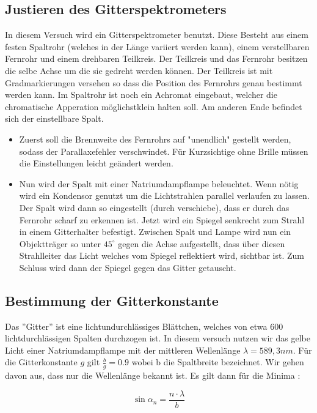 \documentclass[a4paper,titlepage]{scrartcl}
\numberwithin{equation}{section}
\begin{document}
\subsection{Justieren des Gitterspektrometers}
In diesem Versuch wird ein Gitterspektrometer benutzt. Diese Besteht aus einem festen Spaltrohr (welches in der Länge variiert werden kann), einem verstellbaren Fernrohr und einem drehbaren Teilkreis. Der Teilkreis und das Fernrohr besitzen die selbe Achse um die sie gedreht werden können. Der Teilkreis ist mit Gradmarkierungen versehen so dass die Position des Fernrohrs genau bestimmt werden kann. Im Spaltrohr ist noch ein Achromat  eingebaut, welcher die chromatische Apperation möglichstklein halten soll. Am anderen Ende befindet sich der einstellbare Spalt.
 
\begin{itemize}
\item Zuerst soll die Brennweite des Fernrohrs auf "unendlich" gestellt werden, sodass der Parallaxefehler verschwindet. Für Kurzsichtige ohne Brille müssen die Einstellungen leicht geändert werden.
 
\item Nun wird der Spalt mit einer Natriumdampflampe beleuchtet. Wenn nötig wird ein Kondensor genutzt um die Lichtstrahlen parallel verlaufen zu lassen. Der Spalt wird dann so eingestellt (durch verschiebe), dass er durch das Fernrohr scharf zu erkennen ist. Jetzt wird ein Spiegel senkrecht zum Strahl in einem Gitterhalter befestigt. Zwischen Spalt und Lampe wird nun ein Objektträger so unter $45^\circ$ gegen die Achse aufgestellt, dass über diesen Strahlleiter das Licht welches vom Spiegel reflektiert wird, sichtbar ist. Zum Schluss wird dann der Spiegel gegen das Gitter getauscht.
\end{itemize}
 
\subsection{Bestimmung der Gitterkonstante}
 
Das ''Gitter'' ist eine lichtundurchlässiges Blättchen, welches von etwa 600 lichtdurchlässigen Spalten durchzogen ist. In diesem versuch nutzen wir das gelbe Licht einer Natriumdampflampe mit der mittleren Wellenlänge $\lambda = 589,3 nm$. Für die Gitterkonstante $g$ gilt $\frac{b}{g}= 0.9$ wobei b die Spaltbreite bezeichnet. Wir gehen davon aus, dass nur die Wellenlänge bekannt ist. Es gilt dann für die Minima :
 
\begin{equation}
\sin{\alpha_n}= \frac{n \cdot \lambda}{b}
\end{equation}
 
\end{document}
